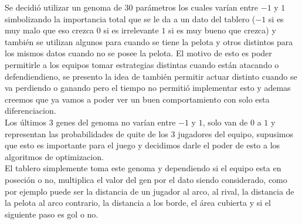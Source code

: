 Se decidió utilizar un genoma de 30 parámetros los cuales varían entre $-1$ y $1$ simbolizando la importancia total
que se le da a un dato del tablero ($-1$ si es muy malo que eso crezca $0$ si es irrelevante $1$ si es muy bueno que crezca)
y también se utilizan algunos para cuando se tiene la pelota y otros distintos para los mismos datos
cuando no se posee la pelota. El motivo de esto es poder permitirle a los equipos tomar estrategias distintas cuando están
atacando o defendiendieno, se presento la idea de también permitir actuar distinto cuando se va perdiendo o ganando pero
el tiempo no permitió implementar esto y ademas creemos que ya vamos a poder ver un buen comportamiento con solo esta
diferenciacion.\\

Los últimos 3 genes del genoma no varían entre $-1$ y $1$, solo van de $0$ a $1$ y representan las probabilidades de quite
de los 3 jugadores del equipo, supusimos que esto es importante para el juego y decidimos darle el poder de esto
a los algoritmos de optimizacion.\\


El tablero simplemente toma este genoma y dependiendo si el equipo esta en poseción o no, multiplica el valor del gen por
el dato siendo considerado, como por ejemplo puede ser la distancia de un jugador al arco, al rival, la distancia de la pelota
al arco contrario, la distancia a los borde, el área cubierta y si el siguiente paso es gol o no.
